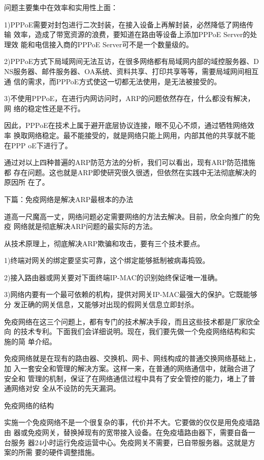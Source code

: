 \documentclass[letterpaper,10pt]{sphinxmanual}
\begin{document}
问题主要集中在效率和实用性上面：

1)PPPoE需要对封包进行二次封装，在接入设备上再解封装，必然降低了网络传输
效率，造成了带宽资源的浪费，要知道在路由等设备上添加PPPoE Server的处理效
能和电信接入商的PPPoE Server可不是一个数量级的。

2)PPPoE方式下局域网间无法互访，在很多网络都有局域网内部的域控服务器、D
NS服务器、邮件服务器、OA系统、资料共享、打印共享等等，需要局域网间相互通
信的需求，而PPPoE方式使这一切都无法使用，是无法被接受的。

3)不使用PPPoE，在进行内网访问时，ARP的问题依然存在，什么都没有解决，网
络的稳定性还是不行。

因此，PPPoE在技术上属于避开底层协议连接，眼不见心不烦，通过牺牲网络效率
换取网络稳定。最不能接受的，就是网络只能上网用，内部其他的共享就不能在PPP
oE下进行了。

通过对以上四种普遍的ARP防范方法的分析，我们可以看出，现有ARP防范措施都
存在问题。这也就是ARP即使研究很久很透，但依然在实践中无法彻底解决的原因所
在了。

下篇：免疫网络是解决ARP最根本的办法

道高一尺魔高一丈，网络问题必定需要网络的方法去解决。目前，欣全向推广的免疫
网络就是彻底解决ARP问题的最实际的方法。

从技术原理上，彻底解决ARP欺骗和攻击，要有三个技术要点。

1)终端对网关的绑定要坚实可靠，这个绑定能够抵制被病毒捣毁。

2)接入路由器或网关要对下面终端IP-MAC的识别始终保证唯一准确。

3)网络内要有一个最可依赖的机构，提供对网关IP-MAC最强大的保护。它既能够分
发正确的网关信息，又能够对出现的假网关信息立即封杀。

免疫网络在这三个问题上，都有专门的技术解决手段，而且这些技术都是厂家欣全向
的技术专利。下面我们会详细说明。现在，我们要先做一个免疫网络结构和实施的简
单介绍。

免疫网络就是在现有的路由器、交换机、网卡、网线构成的普通交换网络基础上，加
入一套安全和管理的解决方案。这样一来，在普通的网络通信中，就融合进了安全和
管理的机制，保证了在网络通信过程中具有了安全管控的能力，堵上了普通网络对安
全从不设防的先天漏洞。

免疫网络的结构

实施一个免疫网络不是一个很复杂的事，代价并不大。它要做的仅仅是用免疫墙路由
器或免疫网关，替换掉现有的宽带接入设备。在免疫墙路由器下，需要自备一台服务
器24小时运行免疫运营中心。免疫网关不需要，已自带服务器。这就是方案的所需
要的硬件调整措施。
\end{document}
